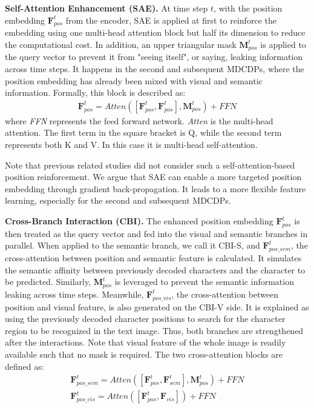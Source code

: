 \noindent\textbf{Self-Attention Enhancement (SAE).}
At time step $t$, with the position embedding $\textbf{F}^t_{pos}$ from the encoder, SAE is applied at first to reinforce the embedding using one multi-head attention block \citep{vaswani2017transformer} but half its dimension to reduce the computational cost. In addition, an upper triangular mask $\textbf{M}^t_{pos}$ is applied to the query vector to prevent it from "seeing itself", or saying, leaking information across time steps. It happens in the second and subsequent MDCDPs, where the position embedding has already been mixed with visual and semantic information. Formally, this block is described as:
\begin{align}
\textbf{F}^t_{pos} = Atten([\textbf{F}^t_{pos},\textbf{F}^t_{pos}],\textbf{M}^t_{pos})+FFN
\label{equ:sae}
\end{align}
\noindent where \emph{FFN} represents the feed forward network. \emph{Atten} is the multi-head attention. The first term in the square bracket is Q, while the second term represents both K and V. In this case it is multi-head self-attention.

Note that previous related studies \citep{ABInet21CVPR,SRNyu2020towards} did not consider such a self-attention-based position reinforcement. We argue that SAE can enable a more targeted position embedding through gradient back-propagation. It leads to a more flexible feature learning, especially for the second and subsequent MDCDPs. 

\noindent\textbf{Cross-Branch Interaction (CBI).} 
The enhanced position embedding $\textbf{F}^t_{pos}$ is then treated as the query vector and fed into the visual and semantic branches in parallel. When applied to the semantic branch, we call it CBI-S, and $\textbf{F}^t_{pos\_sem}$, the cross-attention between position and semantic feature is calculated. It simulates the semantic affinity between previously decoded characters and the character to be predicted. Similarly, $\textbf{M}^t_{pos}$ is leveraged to prevent the semantic information leaking across time steps. Meanwhile, $\textbf{F}^t_{pos\_vis}$, the cross-attention between position and visual feature, is also generated on the CBI-V side. It is explained as using the previously decoded character positions to search for the character region to be recognized in the text image. Thus, both branches are strengthened after the interactions. Note that visual feature of the whole image is readily available such that no mask is required. The two cross-attention blocks are defined as:
\begin{gather}
\textbf{F}^t_{pos\_sem} = Atten([\textbf{F}^t_{pos}, \textbf{F}^t_{sem}],\textbf{M}^t_{pos})+FFN
\label{equ:cbi-s}
\\
\textbf{F}^t_{pos\_vis} = Atten([\textbf{F}^t_{pos}, \textbf{F}_{vis}])+FFN
\label{equ:cbi-v}
\end{gather}

